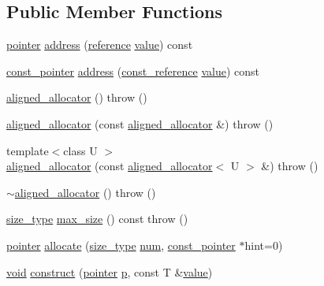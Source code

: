 \subsection*{Public Member Functions}
\begin{DoxyCompactItemize}
\item 
\hyperlink{classaligned__allocator_a6594075542435bfbdd8e96e197b12ab7}{pointer} \hyperlink{classaligned__allocator_a5963089671db15440a963ed9d74bcac8}{address} (\hyperlink{classaligned__allocator_a631a9ed77fe18361d10e8a50ab6d6230}{reference} \hyperlink{glext_8h_aa0e2e9cea7f208d28acda0480144beb0}{value}) const 
\item 
\hyperlink{classaligned__allocator_aee8cbc399662a1e70c84c39f8069e838}{const\-\_\-pointer} \hyperlink{classaligned__allocator_aa0af28bc5933f9b71fefec86e9104798}{address} (\hyperlink{classaligned__allocator_ae809f97ebe11807c77db507b9ae93afc}{const\-\_\-reference} \hyperlink{glext_8h_aa0e2e9cea7f208d28acda0480144beb0}{value}) const 
\item 
\hyperlink{classaligned__allocator_af0a95e34e563359c67168ed98a10f107}{aligned\-\_\-allocator} ()  throw ()
\item 
\hyperlink{classaligned__allocator_a3ada3c01fdcd7b8636012a5202274f83}{aligned\-\_\-allocator} (const \hyperlink{classaligned__allocator}{aligned\-\_\-allocator} \&)  throw ()
\item 
{\footnotesize template$<$class U $>$ }\\\hyperlink{classaligned__allocator_a0f1a31feee380342dbf5443a1e33a187}{aligned\-\_\-allocator} (const \hyperlink{classaligned__allocator}{aligned\-\_\-allocator}$<$ U $>$ \&)  throw ()
\item 
\hyperlink{classaligned__allocator_a491d9002ee6f0ecc4d793082fd2f9fa0}{$\sim$aligned\-\_\-allocator} ()  throw ()
\item 
\hyperlink{classaligned__allocator_a8546aec5c19297c6a68abc86ee5ef728}{size\-\_\-type} \hyperlink{classaligned__allocator_a68bfb27d871c1d3c613031fdb99c63bc}{max\-\_\-size} () const   throw ()
\item 
\hyperlink{classaligned__allocator_a6594075542435bfbdd8e96e197b12ab7}{pointer} \hyperlink{classaligned__allocator_aa3e37ad971ee714647f8727aafc599aa}{allocate} (\hyperlink{classaligned__allocator_a8546aec5c19297c6a68abc86ee5ef728}{size\-\_\-type} \hyperlink{glext_8h_abb50fc1ead3a02a46fb52daa2045f95c}{num}, \hyperlink{classaligned__allocator_aee8cbc399662a1e70c84c39f8069e838}{const\-\_\-pointer} $\ast$hint=0)
\item 
\hyperlink{group___u_a_v_objects_plugin_ga444cf2ff3f0ecbe028adce838d373f5c}{void} \hyperlink{classaligned__allocator_adbd952c0c5cabf60dd1cd8fa397ac759}{construct} (\hyperlink{classaligned__allocator_a6594075542435bfbdd8e96e197b12ab7}{pointer} \hyperlink{glext_8h_aa5367c14d90f462230c2611b81b41d23}{p}, const T \&\hyperlink{glext_8h_aa0e2e9cea7f208d28acda0480144beb0}{value})

\end{DoxyCompactItemize}
